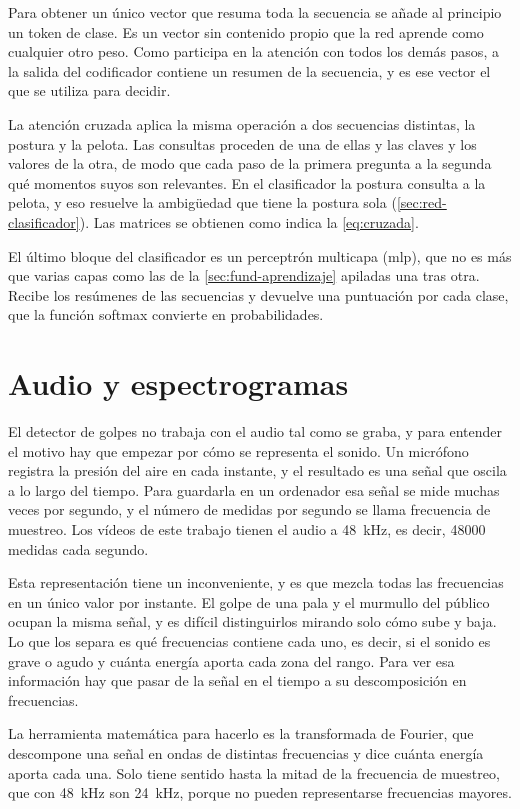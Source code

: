 Para obtener un único vector que resuma toda la secuencia se añade al principio un token de clase.
Es un vector sin contenido propio que la red aprende como cualquier otro peso.
Como participa en la atención con todos los demás pasos, a la salida del codificador contiene un resumen de la secuencia, y es ese vector el que se utiliza para decidir.

La atención cruzada aplica la misma operación a dos secuencias distintas, la postura y la pelota.
Las consultas proceden de una de ellas y las claves y los valores de la otra, de modo que cada paso de la primera pregunta a la segunda qué momentos suyos son relevantes.
En el clasificador la postura consulta a la pelota, y eso resuelve la ambigüedad que tiene la postura sola (\cref{sec:red-clasificador}).
Las matrices se obtienen como indica la \cref{eq:cruzada}.

El último bloque del clasificador es un perceptrón multicapa (\acs{mlp}), que no es más que varias capas como las de la \cref{sec:fund-aprendizaje} apiladas una tras otra.
Recibe los resúmenes de las secuencias y devuelve una puntuación por cada clase, que la función softmax convierte en probabilidades.

\section{Audio y espectrogramas}
\label{sec:fund-audio}

El detector de golpes no trabaja con el audio tal como se graba, y para entender el motivo hay que empezar por cómo se representa el sonido.
Un micrófono registra la presión del aire en cada instante, y el resultado es una señal que oscila a lo largo del tiempo.
Para guardarla en un ordenador esa señal se mide muchas veces por segundo, y el número de medidas por segundo se llama frecuencia de muestreo.
Los vídeos de este trabajo tienen el audio a 48~kHz, es decir, \num{48000} medidas cada segundo.

Esta representación tiene un inconveniente, y es que mezcla todas las frecuencias en un único valor por instante.
El golpe de una pala y el murmullo del público ocupan la misma señal, y es difícil distinguirlos mirando solo cómo sube y baja.
Lo que los separa es qué frecuencias contiene cada uno, es decir, si el sonido es grave o agudo y cuánta energía aporta cada zona del rango.
Para ver esa información hay que pasar de la señal en el tiempo a su descomposición en frecuencias.

La herramienta matemática para hacerlo es la transformada de Fourier, que descompone una señal en ondas de distintas frecuencias y dice cuánta energía aporta cada una.
Solo tiene sentido hasta la mitad de la frecuencia de muestreo, que con 48~kHz son 24~kHz, porque no pueden representarse frecuencias mayores.

